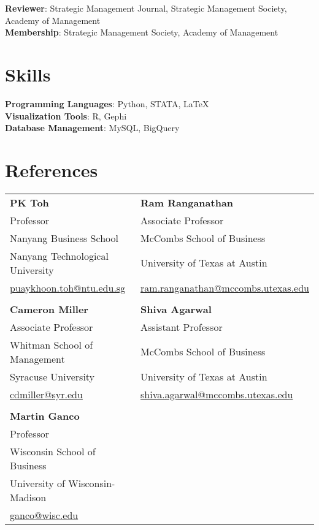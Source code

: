 \documentclass[a4paper,11pt]{article}
\begin{document}
\textbf{Reviewer}{: Strategic Management Journal, Strategic Management Society, Academy of Management}
\\
\textbf{Membership}{: Strategic Management Society, Academy of Management}

\section{Skills}

\textbf{Programming Languages}{: Python, STATA, \LaTeX}
\\
\textbf{Visualization Tools}{: R, Gephi}
\\
\textbf{Database Management}{: MySQL, BigQuery}

\section{References}
\begin{tabular*}{\textwidth}{@{\extracolsep{\fill}} l l}
    \textbf{PK Toh} & \textbf{Ram Ranganathan} \\
    Professor & Associate Professor \\
    Nanyang Business School & McCombs School of Business \\
    Nanyang Technological University & University of Texas at Austin \\
    \href{mailto:puaykhoon.toh@ntu.edu.sg}{puaykhoon.toh@ntu.edu.sg} & \href{mailto:ram.ranganathan@mccombs.utexas.edu}{ram.ranganathan@mccombs.utexas.edu} \\
    \\
    \textbf{Cameron Miller} & \textbf{Shiva Agarwal} \\
    Associate Professor & Assistant Professor \\
    Whitman School of Management & McCombs School of Business \\
    Syracuse University & University of Texas at Austin \\
    \href{mailto:cdmiller@syr.edu}{cdmiller@syr.edu} & 
    \href{mailto:shiva.agarwal@mccombs.utexas.edu}{shiva.agarwal@mccombs.utexas.edu} \\
    \\
    \textbf{Martin Ganco} \\
    Professor \\
    Wisconsin School of Business \\
    University of Wisconsin-Madison \\
    \href{mailto:ganco@wisc.edu}{ganco@wisc.edu}
\end{tabular*}

\end{document}
